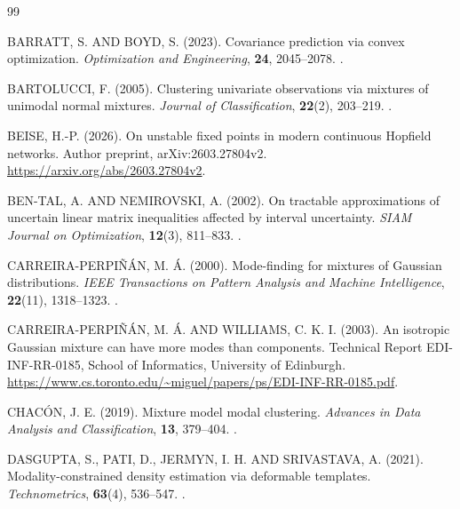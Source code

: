 \begin{thebibliography}{99}

\MakeUppercase{Barratt, S. and Boyd, S.} (2023).
Covariance prediction via convex optimization.
\emph{Optimization and Engineering}, \textbf{24}, 2045--2078.
.

\MakeUppercase{Bartolucci, F.} (2005).
Clustering univariate observations via mixtures of unimodal normal mixtures.
\emph{Journal of Classification}, \textbf{22}(2), 203--219.
.

\MakeUppercase{Beise, H.-P.} (2026).
On unstable fixed points in modern continuous Hopfield networks.
Author preprint, arXiv:2603.27804v2.
\url{https://arxiv.org/abs/2603.27804v2}.

\MakeUppercase{Ben-Tal, A. and Nemirovski, A.} (2002).
On tractable approximations of uncertain linear matrix inequalities affected by interval uncertainty.
\emph{SIAM Journal on Optimization}, \textbf{12}(3), 811--833.
.

\MakeUppercase{Carreira-Perpiñán, M. Á.} (2000).
Mode-finding for mixtures of Gaussian distributions.
\emph{IEEE Transactions on Pattern Analysis and Machine Intelligence},
\textbf{22}(11), 1318--1323.
.

\MakeUppercase{Carreira-Perpiñán, M. Á. and Williams, C. K. I.} (2003).
An isotropic Gaussian mixture can have more modes than components.
Technical Report EDI-INF-RR-0185, School of Informatics, University of Edinburgh.
\url{https://www.cs.toronto.edu/~miguel/papers/ps/EDI-INF-RR-0185.pdf}.

\MakeUppercase{Chacón, J. E.} (2019).
Mixture model modal clustering.
\emph{Advances in Data Analysis and Classification}, \textbf{13}, 379--404.
.

\MakeUppercase{Dasgupta, S., Pati, D., Jermyn, I. H. and Srivastava, A.} (2021).
Modality-constrained density estimation via deformable templates.
\emph{Technometrics}, \textbf{63}(4), 536--547.
.


\end{thebibliography}
